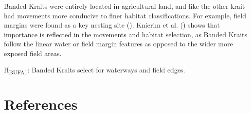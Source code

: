 \documentclass[10pt,a4paper]{article}
\begin{document}
Banded Kraits were entirely located in agricultural land, and like the other krait had movements more conducive to finer habitat classifications.
For example, field margins were found as a key nesting site ().
Knierim et al. () shows that importance is reflected in the movements and habitat selection, as Banded Kraits follow the linear water or field margin features as opposed to the wider more exposed field areas.

H\textsubscript{BUFA1}: Banded Kraits select for waterways and field edges.

\section*{References}\label{references}
\end{document}
